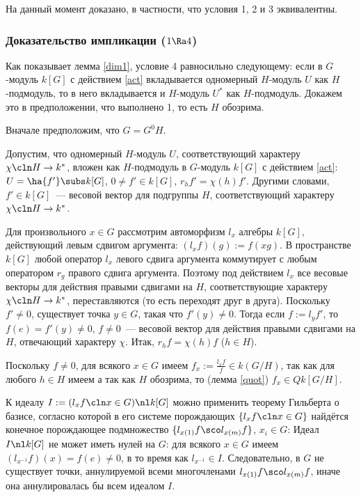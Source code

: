 \documentclass{article}
\begin{document}
На данный момент доказано, в частности, что условия 1, 2 и 3 эквивалентны.

\subsubsection{Доказательство импликации ($1\Ra4$)}

Как показывает лемма \ref{dim1}, условие 4 равносильно следующему: если в $G$-модуль $k[G]$ с действием
\eqref{act} вкладывается одномерный $H$-модуль $U$ как $H$-подмодуль, то в него вкладывается и $H$-модуль $U^*$
как $H$-подмодуль. Докажем это в предположении, что выполнено 1, то есть $H$ обозрима.

Вначале предположим, что $G=G^0H$.

Допустим, что одномерный $H$-модуль $U$, соответствующий характеру $\chi\cln H\to k^*$, вложен как $H$-подмодуль в
$G$-модуль $k[G]$ с действием \eqref{act}: $U=\ha{f'}\subs k[G]$, $0\ne f'\in k[G]$, $r_hf'=\chi(h)f'$. Другими
словами, $f'\in k[G]$~--- весовой вектор для подгруппы $H$, соответствующий характеру $\chi\cln H\to k^*$.

Для произвольного $x\in G$ рассмотрим автоморфизм $l_x$ алгебры $k[G]$, действующий левым сдвигом аргумента:
$(l_xf)(g):=f(xg)$. В пространстве $k[G]$ любой оператор $l_x$ левого сдвига аргумента коммутирует с любым
оператором $r_g$ правого сдвига аргумента. Поэтому под действием $l_x$ все весовые векторы для действия правыми
сдвигами на $H$, соответствующие характеру $\chi\cln H\to k^*$, переставляются (то есть переходят друг в друга).
Поскольку $f'\ne0$, существует точка $y\in G$, такая что $f'(y)\ne0$. Тогда если $f:=l_yf'$, то $f(e)=f'(y)\ne0$,
$f\ne0$~--- весовой вектор для действия правыми сдвигами на $H$, отвечающий характеру $\chi$. Итак,
$r_hf=\chi(h)f$ ($h\in H$).

Поскольку $f\ne0$, для всякого $x\in G$ имеем $f_x:=\frac{l_xf}{f}\in k(G/H)$, так как для любого $h\in H$ имеем
а так как $H$ обозрима, то (лемма \ref{quot}) $f_x\in Qk[G/H]$.

К идеалу $I:=(l_xf\cln x\in G)\nl k[G]$ можно применить теорему Гильберта о базисе, согласно которой в его системе
порождающих $\{l_xf\cln x\in G\}$ найдётся конечное порождающее подмножество $\{l_{x(1)}f\sco l_{x(m)}f\}$,
$x_i\in G$:  Идеал $I\nl k[G]$ не может иметь нулей на $G$: для
всякого $x\in G$ имеем $(l_{x^{-1}}f)(x)=f(e)\ne0$, в то время как $l_{x^{-1}}\in I$. Следовательно, в $G$ не
существует точки, аннулируемой всеми многочленами $l_{x(1)}f\sco l_{x(m)}f$, иначе она аннулировалась бы всем
идеалом $I$.
\end{document}
